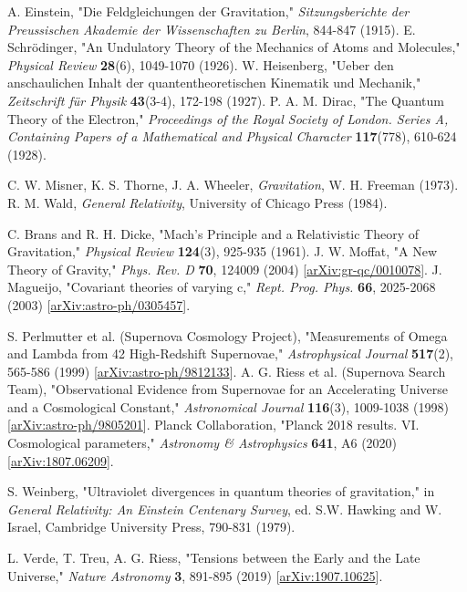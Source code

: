 \documentclass[11pt,a4paper]{article}
\begin{document}
\begin{thebibliography}{99} 

 A. Einstein, "Die Feldgleichungen der Gravitation," \textit{Sitzungsberichte der Preussischen Akademie der Wissenschaften zu Berlin}, 844-847 (1915).
 E. Schr\"odinger, "An Undulatory Theory of the Mechanics of Atoms and Molecules," \textit{Physical Review} \textbf{28}(6), 1049-1070 (1926).
 W. Heisenberg, "Ueber den anschaulichen Inhalt der quantentheoretischen Kinematik und Mechanik," \textit{Zeitschrift f\"ur Physik} \textbf{43}(3-4), 172-198 (1927).
 P. A. M. Dirac, "The Quantum Theory of the Electron," \textit{Proceedings of the Royal Society of London. Series A, Containing Papers of a Mathematical and Physical Character} \textbf{117}(778), 610-624 (1928).

 C. W. Misner, K. S. Thorne, J. A. Wheeler, \textit{Gravitation}, W. H. Freeman (1973).
 R. M. Wald, \textit{General Relativity}, University of Chicago Press (1984).

 C. Brans and R. H. Dicke, "Mach's Principle and a Relativistic Theory of Gravitation," \textit{Physical Review} \textbf{124}(3), 925-935 (1961).
 J. W. Moffat, "A New Theory of Gravity," \textit{Phys. Rev. D} \textbf{70}, 124009 (2004) [\url{arXiv:gr-qc/0010078}].
 J. Magueijo, "Covariant theories of varying c," \textit{Rept. Prog. Phys.} \textbf{66}, 2025-2068 (2003) [\url{arXiv:astro-ph/0305457}]. 

 S. Perlmutter et al. (Supernova Cosmology Project), "Measurements of Omega and Lambda from 42 High-Redshift Supernovae," \textit{Astrophysical Journal} \textbf{517}(2), 565-586 (1999) [\url{arXiv:astro-ph/9812133}]. %
 A. G. Riess et al. (Supernova Search Team), "Observational Evidence from Supernovae for an Accelerating Universe and a Cosmological Constant," \textit{Astronomical Journal} \textbf{116}(3), 1009-1038 (1998) [\url{arXiv:astro-ph/9805201}]. 
 Planck Collaboration, "Planck 2018 results. VI. Cosmological parameters," \textit{Astronomy \& Astrophysics} \textbf{641}, A6 (2020) [\url{arXiv:1807.06209}]. 

 S. Weinberg, "Ultraviolet divergences in quantum theories of gravitation," in \textit{General Relativity: An Einstein Centenary Survey}, ed. S.W. Hawking and W. Israel, Cambridge University Press, 790-831 (1979).

 L. Verde, T. Treu, A. G. Riess, "Tensions between the Early and the Late Universe," \textit{Nature Astronomy} \textbf{3}, 891-895 (2019) [\url{arXiv:1907.10625}].

\end{thebibliography}
\end{document}
